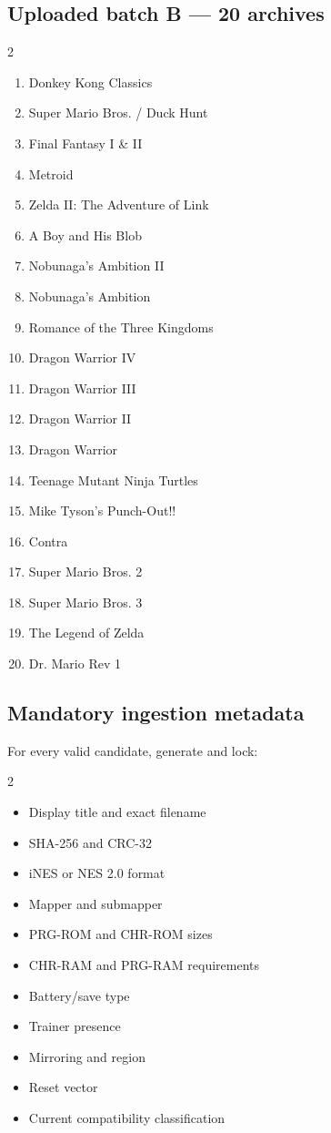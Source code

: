 \documentclass[10pt,letterpaper]{article}
\begin{document}
\subsection{Uploaded batch B --- 20 archives}
\begin{multicols}{2}
\begin{enumerate}
\item Donkey Kong Classics
\item Super Mario Bros. / Duck Hunt
\item Final Fantasy I \& II
\item Metroid
\item Zelda II: The Adventure of Link
\item A Boy and His Blob
\item Nobunaga's Ambition II
\item Nobunaga's Ambition
\item Romance of the Three Kingdoms
\item Dragon Warrior IV
\item Dragon Warrior III
\item Dragon Warrior II
\item Dragon Warrior
\item Teenage Mutant Ninja Turtles
\item Mike Tyson's Punch-Out!!
\item Contra
\item Super Mario Bros. 2
\item Super Mario Bros. 3
\item The Legend of Zelda
\item Dr. Mario Rev 1
\end{enumerate}
\end{multicols}

\subsection{Mandatory ingestion metadata}
For every valid candidate, generate and lock:
\begin{multicols}{2}
\begin{itemize}
\item Display title and exact filename
\item SHA-256 and CRC-32
\item iNES or NES 2.0 format
\item Mapper and submapper
\item PRG-ROM and CHR-ROM sizes
\item CHR-RAM and PRG-RAM requirements
\item Battery/save type
\item Trainer presence
\item Mirroring and region
\item Reset vector
\item Current compatibility classification
\end{itemize}
\end{multicols}
\end{document}
